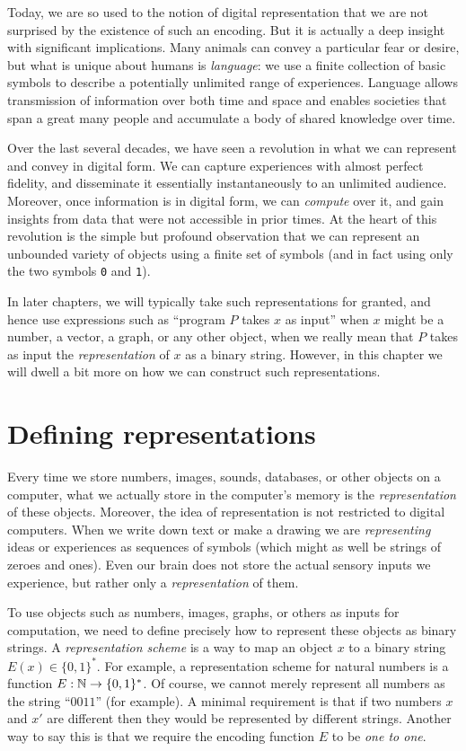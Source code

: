 Today, we are so used to the notion of digital representation that we
are not surprised by the existence of such an encoding. But it is
actually a deep insight with significant implications. Many animals can
convey a particular fear or desire, but what is unique about humans is
\emph{language}: we use a finite collection of basic symbols to describe
a potentially unlimited range of experiences. Language allows
transmission of information over both time and space and enables
societies that span a great many people and accumulate a body of shared
knowledge over time.

Over the last several decades, we have seen a revolution in what we can
represent and convey in digital form. We can capture experiences with
almost perfect fidelity, and disseminate it essentially instantaneously
to an unlimited audience. Moreover, once information is in digital form,
we can \emph{compute} over it, and gain insights from data that were not
accessible in prior times. At the heart of this revolution is the simple
but profound observation that we can represent an unbounded variety of
objects using a finite set of symbols (and in fact using only the two
symbols \texttt{0} and \texttt{1}).

In later chapters, we will typically take such representations for
granted, and hence use expressions such as ``program \(P\) takes \(x\)
as input'' when \(x\) might be a number, a vector, a graph, or any other
object, when we really mean that \(P\) takes as input the
\emph{representation} of \(x\) as a binary string. However, in this
chapter we will dwell a bit more on how we can construct such
representations.

\section{Defining representations}\label{Defining-representations}

Every time we store numbers, images, sounds, databases, or other objects
on a computer, what we actually store in the computer's memory is the
\emph{representation} of these objects. Moreover, the idea of
representation is not restricted to digital computers. When we write
down text or make a drawing we are \emph{representing} ideas or
experiences as sequences of symbols (which might as well be strings of
zeroes and ones). Even our brain does not store the actual sensory
inputs we experience, but rather only a \emph{representation} of them.

To use objects such as numbers, images, graphs, or others as inputs for
computation, we need to define precisely how to represent these objects
as binary strings. A \emph{representation scheme} is a way to map an
object \(x\) to a binary string \(E(x) \in \{0,1\}^*\). For example, a
representation scheme for natural numbers is a function
\(E:{\mathbb{N}} \rightarrow \{0,1\}^*\). Of course, we cannot merely represent
all numbers as the string ``\(0011\)'' (for example). A minimal
requirement is that if two numbers \(x\) and \(x'\) are different then
they would be represented by different strings. Another way to say this
is that we require the encoding function \(E\) to be \emph{one to one}.

